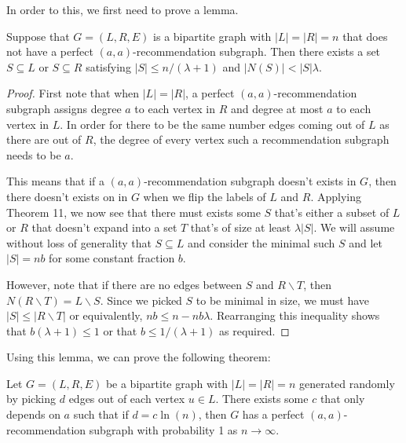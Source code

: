 In order to this, we first need to prove a lemma.

\begin{lem}
Suppose that $G=(L,R,E)$ is a bipartite graph with $|L|=|R|=n$ that does not have a perfect $(a,a)$-recommendation subgraph. Then there exists a set $S\subseteq L$ or $S\subseteq R$ satisfying $|S|\leq n/(\lambda+1)$ and $|N(S)| < |S|\lambda$.
\end{lem}

\begin{proof}
First note that when $|L|=|R|$, a perfect $(a,a)$-recommendation subgraph assigns degree $a$ to each vertex in $R$ and degree at most $a$ to each vertex in $L$. In order for there to be the same number edges coming out of $L$ as there are out of $R$, the degree of every vertex such a recommendation subgraph needs to be $a$.\vs

This means that if a $(a,a)$-recommendation subgraph doesn't exists in $G$, then there doesn't exists on in $G$ when we flip the labels of $L$ and $R$. Applying Theorem 11, we now see that there must exists some $S$ that's either a subset of $L$ or $R$ that doesn't expand into a set $T$ that's of size at least $\lambda|S|$. We will assume without loss of generality that $S\subseteq L$ and consider the minimal such $S$ and let $|S|=nb$ for some constant fraction $b$. \vs

However, note that if there are no edges between $S$ and $R\backslash T$, then $N(R\backslash T) = L\backslash S$. Since we picked $S$ to be minimal in size, we must have $|S|\leq |R\backslash T|$ or equivalently, $nb \leq n -nb\lambda$. Rearranging this inequality shows that $b(\lambda+1) \leq 1$ or that $b\leq 1/(\lambda+1)$ as required.
\end{proof}

Using this lemma, we can prove the following theorem:

\begin{thm} 
Let $G=(L,R,E)$ be a bipartite graph with $|L|=|R|=n$ generated randomly by picking $d$ edges out of each vertex $u\in L$. There exists some $c$ that only depends on $a$ such that if $d=c\ln(n)$, then $G$ has a perfect $(a,a)$-recommendation subgraph with probability 1 as $n\to\infty$.
\end{thm}

